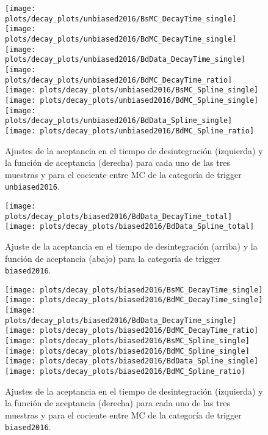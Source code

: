 \begin{figure}[H]
\centering
\begin{multicols}{2}
\texttt{[image: plots/decay\_plots/unbiased2016/BsMC\_DecayTime\_single]}
\texttt{[image: plots/decay\_plots/unbiased2016/BdMC\_DecayTime\_single]}
\texttt{[image: plots/decay\_plots/unbiased2016/BdData\_DecayTime\_single]}
\texttt{[image: plots/decay\_plots/unbiased2016/BdMC\_DecayTime\_ratio]}
\texttt{[image: plots/decay\_plots/unbiased2016/BsMC\_Spline\_single]}
\texttt{[image: plots/decay\_plots/unbiased2016/BdMC\_Spline\_single]}
\texttt{[image: plots/decay\_plots/unbiased2016/BdData\_Spline\_single]}
\texttt{[image: plots/decay\_plots/unbiased2016/BdMC\_Spline\_ratio]}
\end{multicols}
\caption{Ajustes de la aceptancia en el tiempo de desintegración (izquierda) y la función de aceptancia (derecha) para cada uno de las tres muestras y para el cociente entre MC de la categoría de trigger \texttt{unbiased2016}.}  \label{fig:acctimeotherunbiased2016}
\end{figure}


\begin{figure}[H]
\centering
\texttt{[image: plots/decay\_plots/biased2016/BdData\_DecayTime\_total]}
\texttt{[image: plots/decay\_plots/biased2016/BdData\_Spline\_total]}
\caption{Ajuste de la aceptancia en el tiempo de desintegración (arriba) y la función de aceptancia (abajo) para la categoría de trigger \texttt{biased2016}.}  \label{fig:acctimebsdatabiased2016}
\end{figure}


\begin{figure}[H]
\centering
\begin{multicols}{2}
\texttt{[image: plots/decay\_plots/biased2016/BsMC\_DecayTime\_single]}
\texttt{[image: plots/decay\_plots/biased2016/BdMC\_DecayTime\_single]}
\texttt{[image: plots/decay\_plots/biased2016/BdData\_DecayTime\_single]}
\texttt{[image: plots/decay\_plots/biased2016/BdMC\_DecayTime\_ratio]}
\texttt{[image: plots/decay\_plots/biased2016/BsMC\_Spline\_single]}
\texttt{[image: plots/decay\_plots/biased2016/BdMC\_Spline\_single]}
\texttt{[image: plots/decay\_plots/biased2016/BdData\_Spline\_single]}
\texttt{[image: plots/decay\_plots/biased2016/BdMC\_Spline\_ratio]}
\end{multicols}
\caption{Ajustes de la aceptancia en el tiempo de desintegración (izquierda) y la función de aceptancia (derecha) para cada uno de las tres muestras y para el cociente entre MC de la categoría de trigger \texttt{biased2016}.}  \label{fig:acctimeotherbiased2016}
\end{figure}



